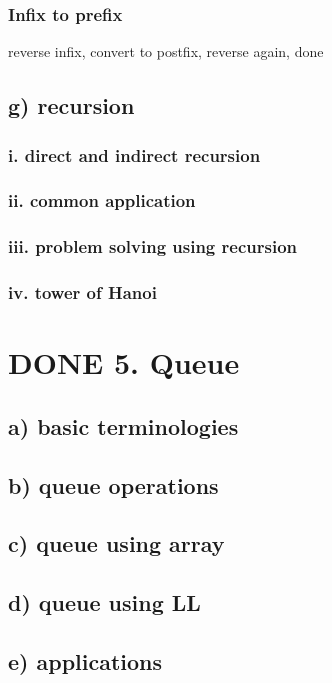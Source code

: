 \documentclass[11pt]{article}
\begin{document}
\subsubsection{Infix to prefix}
\label{sec:orgf6fac7e}
reverse infix, convert to postfix, reverse again, done 
\subsection{g) recursion}
\label{sec:orga8aca64}
\subsubsection{i. direct and indirect recursion}
\label{sec:orge9d83aa}
\subsubsection{ii. common application}
\label{sec:org9c105aa}
\subsubsection{iii. problem solving using recursion}
\label{sec:org05756c9}
\subsubsection{iv. tower of Hanoi}
\label{sec:org167cbbe}
\section{{\bfseries\sffamily DONE} 5. Queue}
\label{sec:org84ffe24}
\subsection{a) basic terminologies}
\label{sec:org276b7d8}
\subsection{b) queue operations}
\label{sec:orgf627a69}
\subsection{c) queue using array}
\label{sec:org682e4d3}
\subsection{d) queue using LL}
\label{sec:orgb5f5a46}
\subsection{e) applications}
\label{sec:org8c2aa9f}
\end{document}
